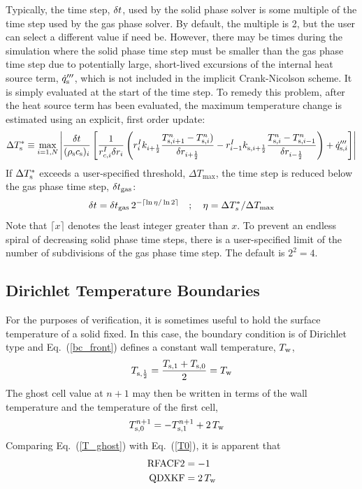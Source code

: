 Typically, the time step, $\delta t$, used by the solid phase solver is some multiple of the time step used by the gas phase solver. By default, the multiple is 2, but the user can select a different value if need be. However, there may be times during the simulation where the solid phase time step must be smaller than the gas phase time step due to potentially large, short-lived excursions of the internal heat source term, $\dot{q}_{\rm s}'''$, which is not included in the implicit Crank-Nicolson scheme. It is simply evaluated at the start of the time step. To remedy this problem, after the heat source term has been evaluated, the maximum temperature change is estimated using an explicit, first order update:
\begin{equation}
  \Delta T_{\rm s}^* \equiv \max_{i=1,N} \left| \frac{\delta t}{(\rho_{\rm s} c_{\rm s})_i} \left[ \frac{1}{r_{c,i}^I \delta r_i} \left( r_{i}^I k_{i+\frac{1}{2}} \frac{T_{{\rm s},i+1}^n-T_{{\rm s},i}^n)}{\delta r_{i+\frac{1}{2}}} - r_{i-1}^I k_{{\rm s},i+\frac{1}{2}} \frac{T_{{\rm s},i}^n-T_{{\rm s},i-1}^n}{\delta r_{i-\frac{1}{2}}} \right) + \dot{q}_{{\rm s},i}''' \right] \right|
\end{equation}
If $\Delta T_{\rm s}^*$ exceeds a user-specified threshold, $\Delta T_{\max}$, the time step is reduced below the gas phase time step, $\delta t_{\rm gas}$:
\begin{equation}
   \delta t = \delta t_{\rm gas} \, 2^{-\lceil \ln \eta / \ln 2 \rceil }  \quad ; \quad \eta = \Delta T_{s}^*  / \Delta T_{\max}
\end{equation}
Note that $\lceil x \rceil$ denotes the least integer greater than $x$. To prevent an endless spiral of decreasing solid phase time steps, there is a user-specified limit of the number of subdivisions of the gas phase time step. The default is $2^2=4$.

\subsection*{Dirichlet Temperature Boundaries}

For the purposes of verification, it is sometimes useful to hold the surface temperature of a solid fixed.  In this case, the boundary condition is of Dirichlet type and Eq.~(\ref{bc_front}) defines a constant wall temperature, $T_{\rm w}$,
\begin{equation}
\label{T_front_dirichlet}
  T_{\rm s,\frac{1}{2}} = \frac{T_{\rm s,1}+T_{\rm s,0}}{2} = T_{\rm w}
\end{equation}
The ghost cell value at $n+1$ may then be written in terms of the wall temperature and the temperature of the first cell,
\begin{align}
\label{T_ghost}
  T_{\rm s,0}^{n+1} &= - T_{\rm s,1}^{n+1} + 2\, T_{\rm w}
\end{align}
Comparing Eq.~(\ref{T_ghost}) with Eq.~(\ref{T0}), it is apparent that
\begin{align}
\hbox{\ct{RFACF2}} &= -1 \\
\hbox{\ct{QDXKF}}  &= 2\, T_{\rm w}
\end{align}



